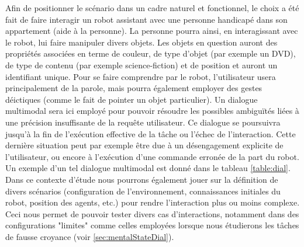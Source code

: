 \documentclass[a4paper,11pt,twoside]{StyleThese}
\begin{document}
Afin de positionner le scénario dans un cadre naturel et fonctionnel, le choix a été
fait de faire interagir un robot assistant avec une personne handicapé dans son appartement (aide
à la personne). La personne pourra ainsi, en interagissant avec le robot, lui faire manipuler divers objets. Les objets en question auront des propriétés associées en terme de couleur, de type d'objet (par exemple un DVD), de type de contenu (par exemple science-fiction) et de position et auront un identifiant unique. Pour se faire comprendre
par le robot, l’utilisateur usera principalement de la parole, mais pourra également employer des gestes déictiques (comme le fait de pointer un objet particulier).
Un dialogue multimodal sera ici employé pour pouvoir résoudre les possibles ambiguïtés liées à une précision insuffisante de la requête utilisateur.
Ce dialogue se poursuivra jusqu’à la fin de l’exécution effective de la tâche ou
l’échec de l’interaction. Cette dernière situation peut par exemple être due à un désengagement explicite de l’utilisateur, ou encore à l’exécution d’une commande erronée
de la part du robot. Un exemple d’un tel dialogue multimodal est donné dans le tableau \ref{table:dial}.
Dans ce contexte d’étude nous pourrons également jouer sur la définition de divers
scénarios (configuration de l’environnement, connaissances initiales du robot, position
des agents, etc.) pour rendre l’interaction plus ou moins complexe. Ceci nous permet de
pouvoir tester divers cas d’interactions, notamment dans des configurations "limites" comme celles employées lorsque nous étudierons les tâches de fausse croyance (voir \ref{sec:mentalStateDial}).
\end{document}
